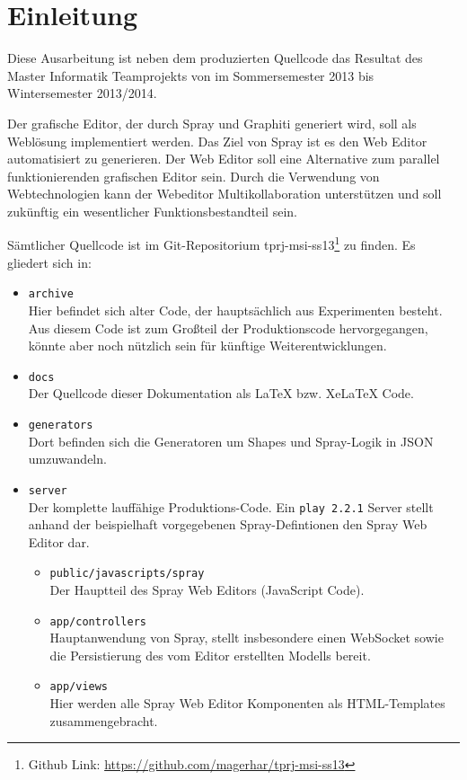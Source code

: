 \section{Einleitung}

Diese Ausarbeitung ist neben dem produzierten Quellcode das Resultat des
Master Informatik Teamprojekts von \autor im Sommersemester 2013 bis
Wintersemester 2013/2014.

Der grafische Editor, der durch Spray und Graphiti generiert wird, soll als Weblösung implementiert werden.
Das Ziel von Spray ist es den Web Editor automatisiert zu generieren. Der Web Editor soll eine Alternative
zum parallel funktionierenden grafischen Editor sein. Durch die Verwendung von Webtechnologien kann der Webeditor
Multikollaboration unterstützen und soll zukünftig ein wesentlicher Funktionsbestandteil sein.

Sämtlicher Quellcode ist im Git-Repositorium
tprj-msi-ss13\footnote{Github Link: \url{https://github.com/magerhar/tprj-msi-ss13}} zu finden.
Es gliedert sich in:

\begin{itemize}
  \item {\tt archive} \\
  Hier befindet sich alter Code, der hauptsächlich aus Experimenten besteht.
  Aus diesem Code ist zum Großteil der Produktionscode hervorgegangen,
  könnte aber noch nützlich sein für künftige Weiterentwicklungen.
  \item {\tt docs} \\
  Der Quellcode dieser Dokumentation als LaTeX bzw. XeLaTeX Code.
  \item {\tt generators} \\
  Dort befinden sich die Generatoren um Shapes und Spray-Logik in JSON umzuwandeln.
  \item {\tt server} \\
  Der komplette lauffähige Produktions-Code.
  Ein {\tt play 2.2.1} Server stellt anhand der beispielhaft vorgegebenen
  Spray-Defintionen den Spray Web Editor dar.
  \begin{itemize}
    \item {\tt public/javascripts/spray} \\
    Der Hauptteil des Spray Web Editors (JavaScript Code).
    \item {\tt app/controllers} \\
    Hauptanwendung von Spray, stellt insbesondere einen WebSocket sowie die
    Persistierung des vom Editor erstellten Modells bereit.
    \item {\tt app/views} \\
    Hier werden alle Spray Web Editor Komponenten als HTML-Templates zusammengebracht.
  \end{itemize}
\end{itemize}

